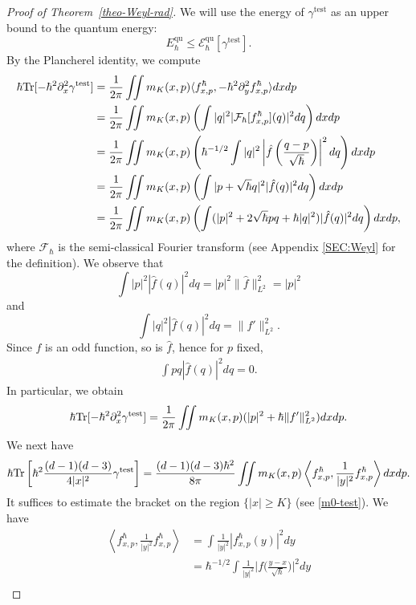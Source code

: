\documentclass[%
11pt,  reqno]{amsart}
\theoremstyle{remarkstyle}
\newcommand{\1}{\hspace{0.2mm}\text{I}\hspace{0.2mm}}
\newcommand{\jb}[1]
{\langle #1 \rangle}
\DeclareMathOperator*{\qua}{qu}
\DeclareMathOperator*{\test}{test}
\numberwithin{equation}{section}
\numberwithin{theorem}{section}
\begin{document}
\begin{proof}[Proof of Theorem~\ref{theo-Weyl-rad}]
		We will use the energy of $\gamma^{\test}$ as an upper bound to the quantum energy:
		$$E^{\qua}_{\hbar} \leq \mathcal E^{\qua}_{\hbar} \left[\gamma ^{\test}\right].$$
		By the Plancherel identity, we compute
		\begin{align*}
			\hbar {\rm Tr}[-\hbar^2 \partial^2_x \gamma^{\test}] &=\frac{1}{2\pi} \iint m_{K}(x,p) \jb{f^{\hbar}_{x,p}, -\hbar^2\partial^2_y f^{\hbar}_{x,p}} dxdp \\
			&= \frac{1}{2\pi}\iint m_{K}(x,p)\left(\int |q|^2 |\mathcal F_{\hbar}[f^\hbar_{x,p}](q)|^2 dq\right)dxdp \\
			&= \frac{1}{2\pi} \iint m_{K}(x,p)\left(\hbar^{-1/2}\int |q|^2 \left|\hat{f}\left(\frac{q-p}{\sqrt{\hbar}}\right)\right|^2 dq\right)dxdp \\
			&=\frac{1}{2\pi}\iint m_{K}(x,p)\left(\int |p+\sqrt{\hbar}q|^2 |\hat{f}(q)|^2 dq\right)dxdp \\
			&=\frac{1}{2\pi}\iint m_K(x,p) \left(\int (|p|^2 + 2\sqrt{\hbar}pq + \hbar |q|^2)|\hat{f}(q)|^2 dq\right)dxdp,
		\end{align*}
		where $\mathcal F_{\hbar}$ is the semi-classical Fourier transform (see Appendix \ref{SEC:Weyl} for the definition). We observe that
		$$
		\int |p|^2 |\hat{f}(q)|^2 dq = |p|^2 \|\hat{f}\|^2_{L^2}=|p|^2
		$$
		and
		$$
		\int |q|^2 |\hat{f}(q)|^2 dq = \|f'\|^2_{L^2}.
		$$
		Since $f$ is an odd function, so is $\hat{f}$, hence for $p$ fixed,
		\begin{align*}
			\int pq |\hat{f}(q)|^2 dq = 0.  
		\end{align*}
		In particular, we obtain
		\begin{align}\label{iden-1}
			\hbar {\rm Tr}[-\hbar^2 \partial^2_x \gamma^{\test}] = \frac{1}{2\pi} \iint m_K(x,p) (|p|^2 + \hbar \|f'\|^2_{L^2}) dxdp. 
		\end{align}
		We next have
		\begin{align*}
			\hbar {\rm Tr}\left[\hbar^2 \frac{(d-1)(d-3)}{4|x|^2} \gamma^{\test}\right] = \frac{(d-1)(d-3) \hbar^2}{8\pi} \iint m_K(x,p) \left \langle f^{\hbar}_{x,p}, \frac{1}{|y|^2}f^{\hbar}_{x,p}\right \rangle dxdp.
		\end{align*}
		It suffices to estimate the bracket on the region $\{|x|\geq K\}$ (see \eqref{m0-test}). We have
		\begin{align*}
			\left \langle f^{\hbar}_{x,p}, \frac{1}{|y|^2}f^{\hbar}_{x,p}\right \rangle &= \int \frac{1}{|y|^2}|f^{\hbar}_{x,p}(y)|^2 dy \\
			&= \hbar^{-1/2}\int \frac{1}{|y|^2}\Big|f\Big(\frac{y-x}{\sqrt{\hbar}}\Big)\Big|^2 dy \\

\end{align*}
\end{proof}
\end{document}
